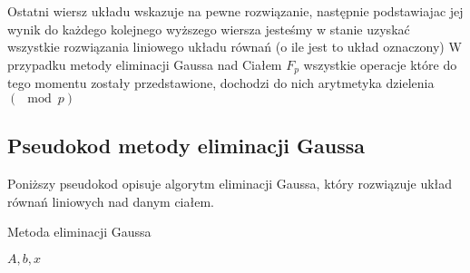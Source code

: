\documentclass{article}
\begin{document}
 Ostatni wiersz układu wskazuje na pewne rozwiązanie, następnie podstawiajac jej wynik do każdego kolejnego wyższego wiersza jesteśmy w stanie uzyskać wszystkie rozwiązania liniowego układu równań (o ile jest to układ oznaczony)
\newline
\newline
W przypadku metody eliminacji Gaussa nad Ciałem \begin{math}  F_{p}  \end{math} wszystkie operacje które do tego momentu zostały przedstawione, dochodzi do nich arytmetyka dzielenia \begin{math}
    ( \mod p )
\end{math}

\newpage

\subsection{Pseudokod metody eliminacji Gaussa} \label{Pseudokod Metody eliminacji Gaussa}

Poniższy pseudokod opisuje algorytm eliminacji Gaussa, który rozwiązuje układ równań liniowych nad danym ciałem.

\begin{algorithm}[H]
\caption{Metoda eliminacji Gaussa}
\renewcommand{\algorithmicrequire}{\textbf{Wejście:}}
\begin{algorithmic}[1]
    \REQUIRE $A,b,x$
            \ENDFOR
        \ENDFOR
    \ENDFOR
{}
\ENDFOR
{}
\ENDFOR
\end{algorithmic}
\end{algorithm}


\newpage
\end{document}
